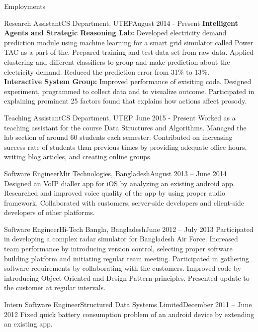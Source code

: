 \documentclass[]{mcdowellcv}
\begin{document}
	\begin{cvsection}{Employments}
		
		\begin{cvsubsection}{Research Assistant}{CS Department, UTEP}{August 2014 - Present}
			\textbf{Intelligent Agents and Strategic Reasoning Lab:} Developed electricity demand prediction module using machine learning for a smart grid simulator called Power TAC as a part of the. Prepared training and test data set from raw data. Applied clustering and different classifiers to group and make prediction about the electricity demand. Reduced the prediction error from 31\% to 13\%. \\
			\textbf{Interactive System Group:} Improved performance of exisiting code. Designed experiment, programmed to collect data and to visualize outcome. Participated in explaining prominent 25 factors found that explains how actions affect prosody.
		\end{cvsubsection}
		
		\begin{cvsubsection}{Teaching Assistant}{CS Department, UTEP }{June 2015 - Present}
			Worked as a teaching assistant for the course Data Structures and Algorithms. Managed the lab section of around 60 students each semester. Contributed on increasing success rate of students than previous times by providing adequate office hours, writing blog articles, and creating online groups.
		\end{cvsubsection}
		
		\begin{cvsubsection}{Software Engineer}{Mir Technologies, Bangladesh}{August 2013 -- June 2014}
		Designed an VoIP dialler app for iOS by analyzing an existing android app. Researched and improved voice quality of the app by using proper audio framework. Collaborated with customers, server-side developers and client-side developers of other platforms. 
\end{cvsubsection}		
		\begin{cvsubsection}{Software Engineer}{Hi-Tech Bangla, Bangladesh}{June 2012 -- July 2013}	
Participated in developing a complex radar simulator for Bangladesh Air Force. Increased team performance by introducing version control, selecting proper software building platform and initiating regular team meeting. Participated in gathering software requirements by collaborating with the customers. Improved code by introducing Object Oriented and Design Pattern principles. Presented  update to the customer at regular intervals.
		\end{cvsubsection}
		
		\begin{cvsubsection}{Intern Software Engineer}{Structured Data Systems Limited}{December 2011 -- June 2012}	
			Fixed quick battery consumption problem of an android device by extending an existing app.
		\end{cvsubsection}		
	\end{cvsection}
	
\end{document}
